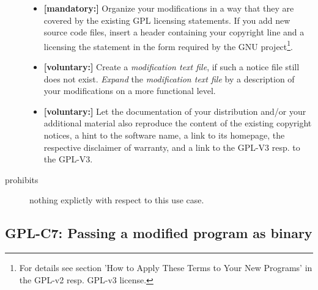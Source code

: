 \begin{description}
\begin{itemize}
  \item \textbf{[mandatory:]} Organize your modifications in a way that they are
  covered by the existing GPL licensing statements. If you add new source code
  files, insert a header containing your copyright line and a licensing the
  statement in the form required by the GNU project\footnote{For details see
  section 'How to Apply These Terms to Your New Programs' in the GPL-v2 resp.
  GPL-v3 license.}.
   
  \item \textbf{[voluntary:]} Create a \emph{modification text file}, if such a
  notice file still does not exist. \emph{Expand} the \emph{modification text
  file} by a description of your modifications on a more functional level.
    
  \item \textbf{[voluntary:]} Let the documentation of your distribution and/or
  your additional material also reproduce the content of the existing copyright
  notices, a hint to the software name, a link to its homepage, the respective
  disclaimer of warranty, and a link to the GPL-V3 resp. to the GPL-V3.
  
 \end{itemize}
 
\item[prohibits] nothing explictly with respect to this use case.

\end{description}

\subsection{GPL-C7: Passing a modified program as binary}
\label{OSUC-04B-GPL}

